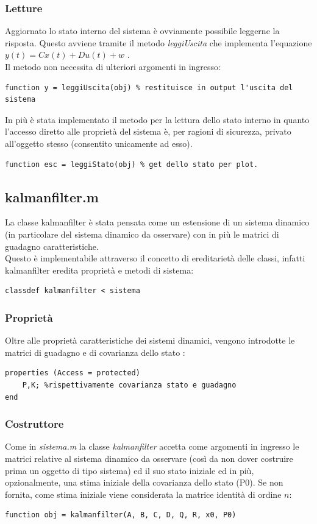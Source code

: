 \subsubsection{Letture}
Aggiornato lo stato interno del sistema è ovviamente possibile leggerne la risposta. Questo avviene tramite il metodo \textit{leggiUscita} che implementa l'equazione $y(t) = Cx(t)+Du(t)+w$ .\\
Il metodo non necessita di ulteriori argomenti in ingresso:

\begin{lstlisting}[frame=single]
function y = leggiUscita(obj) % restituisce in output l'uscita del sistema 
\end{lstlisting}

In più è stata implementato il metodo per la lettura dello stato interno in quanto l'accesso diretto alle proprietà del sistema è, per ragioni di sicurezza, privato all'oggetto stesso (consentito unicamente ad esso).
\begin{lstlisting}[frame=single]
function esc = leggiStato(obj) % get dello stato per plot.
\end{lstlisting}

\newpage

\subsection{kalmanfilter.m}
La classe kalmanfilter è stata pensata come un estensione di un sistema dinamico (in particolare del sistema dinamico da osservare) con in più le matrici di guadagno caratteristiche.\\
Questo è implementabile attraverso il concetto di ereditarietà delle classi, infatti kalmanfilter eredita proprietà e metodi di sistema:
\begin{lstlisting}[frame=single]
classdef kalmanfilter < sistema 
\end{lstlisting}
\subsubsection{Proprietà}
Oltre alle proprietà caratteristiche dei sistemi dinamici, vengono introdotte le matrici di guadagno e di covarianza dello stato :
\begin{lstlisting}[frame=single]
properties (Access = protected)
	P,K; %rispettivamente covarianza stato e guadagno
end
\end{lstlisting}
\subsubsection{Costruttore}
Come in \textit{sistema.m} la classe \textit{kalmanfilter} accetta come argomenti in ingresso le matrici relative al sistema dinamico da osservare (così da non dover costruire prima un oggetto di tipo sistema) ed il suo stato iniziale ed in più, opzionalmente, una stima  iniziale della covarianza dello stato (P0). Se non fornita, come stima iniziale viene considerata la matrice identità di ordine $n$:
\begin{lstlisting}[frame=single]
function obj = kalmanfilter(A, B, C, D, Q, R, x0, P0)
\end{lstlisting}

